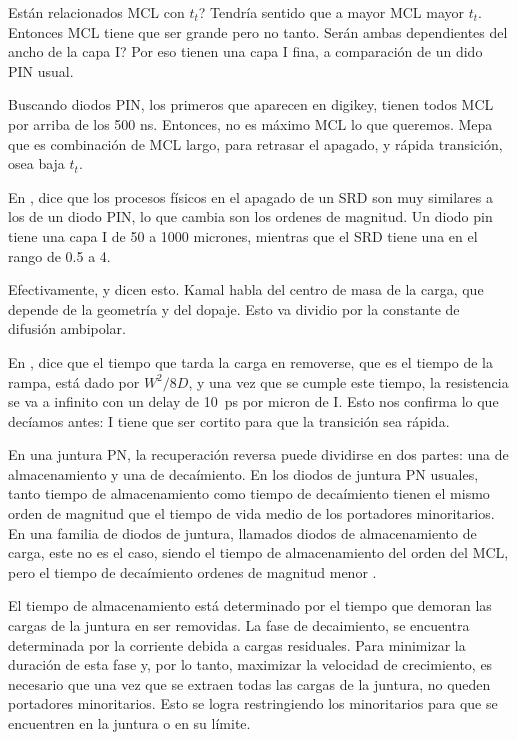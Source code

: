 Están relacionados MCL con $t_t$? Tendría sentido que a mayor MCL mayor $t_t$.
Entonces MCL tiene que ser grande pero no tanto. Serán ambas dependientes del
ancho de la capa I? Por eso tienen una capa I fina, a comparación de un dido PIN
usual.

Buscando diodos PIN, los primeros que aparecen en digikey, tienen todos MCL por
arriba de los 500 ns. Entonces, no es máximo MCL lo que queremos. Mepa que es
combinación de MCL largo, para retrasar el apagado, y rápida transición, osea
baja $t_t$.

En \cite{moll1969}, dice que los procesos físicos en el apagado de un SRD son
muy similares a los de un diodo PIN, lo que cambia son los ordenes de magnitud.
Un diodo pin tiene una capa I de 50 a 1000 micrones, mientras que el SRD tiene
una en el rango de 0.5 a 4.

Efectivamente, \cite{moll1969} y \cite{kamal2014} dicen esto. Kamal habla del
centro de masa de la carga, que depende de la geometría y del dopaje. Esto va
dividio por la constante de difusión ambipolar.

En \cite{moll1969}, dice que el tiempo que tarda la carga en removerse, que es
el tiempo de la rampa, está dado por $W^2/8D$, y una vez que se cumple este
tiempo, la resistencia se va a infinito con un delay de \qty{10}{\pico\second}
por micron de I. Esto nos confirma lo que decíamos antes: I tiene que ser
cortito para que la transición sea rápida.

En una juntura PN, la recuperación reversa puede dividirse en dos partes: una de
almacenamiento y una de decaímiento. En los diodos de juntura PN usuales, tanto
tiempo de almacenamiento como tiempo de decaímiento tienen el mismo orden de
magnitud que el tiempo de vida medio de los portadores minoritarios. En una
familia de diodos de juntura, llamados diodos de almacenamiento de carga, este
no es el caso, siendo el tiempo de almacenamiento del orden del MCL, pero el
tiempo de decaímiento ordenes de magnitud menor \cite{moll1962}.

El tiempo de almacenamiento está determinado por el tiempo que demoran las
cargas de la juntura en ser removidas. La fase de decaimiento, se encuentra
determinada por la corriente debida a cargas residuales. Para minimizar la
duración de esta fase y, por lo tanto, maximizar la velocidad de crecimiento, es
necesario que una vez que se extraen todas las cargas de la juntura, no queden
portadores minoritarios. Esto se logra restringiendo los minoritarios para que
se encuentren en la juntura o en su límite. \cite{moll1962}

